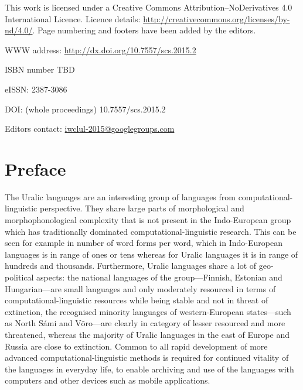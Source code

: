 \documentclass[b5paper]{book}
\begin{document}
\frontmatter

\cleardoublepage
\thispagestyle{empty}
{\centering{}}

This work is licensed under a Creative Commons Attribution–NoDerivatives
4.0 International Licence.  Licence details:
\url{http://creativecommons.org/licenses/by-nd/4.0/}. Page numbering and
footers have been added by the editors.

WWW address: \url{http://dx.doi.org/10.7557/scs.2015.2}

ISBN number TBD

eISSN: 2387-3086

DOI: (whole proceedings) 10.7557/scs.2015.2

Editors contact: \url{iwclul-2015@googlegroups.com}

\clearpage

\pagestyle{fancy}

\chapter*{Preface}

The Uralic languages are an interesting group of languages from
computational-linguistic perspective. They share large parts of morphological
and morphophonological complexity that is not present in the Indo-European
group which has traditionally dominated computational-linguistic research. This
can be seen for example in number of word forms per word, which in
Indo-European languages is in range of ones or tens whereas for Uralic
languages it is in range of hundreds and thousands. Furthermore, Uralic
languages share a lot of geo-political aspects: the national languages of the
group---Finnish, Estonian and Hungarian---are small languages and only
moderately resourced in terms of computational-linguistic resources while being
stable and not in threat of extinction, the recognised minority languages of
western-European states---such as North Sámi and Võro---are clearly in category
of lesser resourced and more threatened, whereas the majority of Uralic
languages in the east of Europe and Russia are close to extinction. Common to
all rapid development of more advanced computational-linguistic methods is
required for continued vitality of the languages in everyday life, to enable
archiving and use of the languages with computers and other devices such as
mobile applications.
\end{document}
